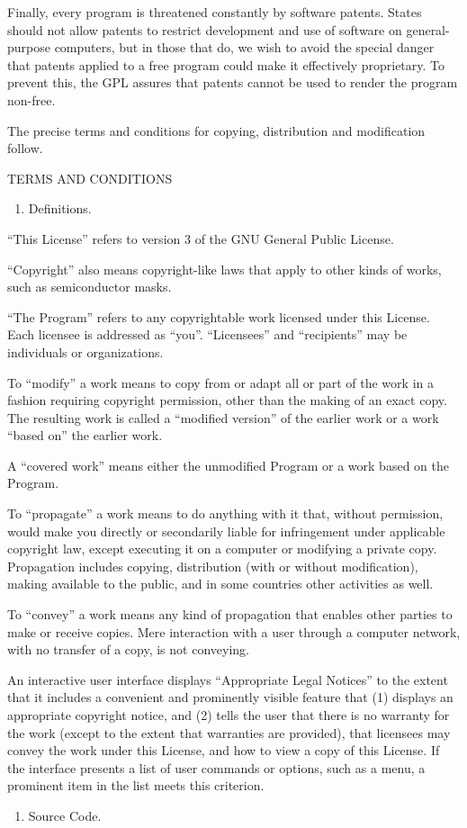 \documentclass[letterpaper,10pt,english]{sphinxmanual}
\begin{document}
Finally, every program is threatened constantly by software patents.
States should not allow patents to restrict development and use of
software on general-purpose computers, but in those that do, we wish to
avoid the special danger that patents applied to a free program could
make it effectively proprietary.  To prevent this, the GPL assures that
patents cannot be used to render the program non-free.

The precise terms and conditions for copying, distribution and
modification follow.

TERMS AND CONDITIONS
\begin{enumerate}
%
\setcounter{enumi}{-1}
\item {} 
Definitions.

\end{enumerate}

“This License” refers to version 3 of the GNU General Public License.

“Copyright” also means copyright-like laws that apply to other kinds of
works, such as semiconductor masks.

“The Program” refers to any copyrightable work licensed under this
License.  Each licensee is addressed as “you”.  “Licensees” and
“recipients” may be individuals or organizations.

To “modify” a work means to copy from or adapt all or part of the work
in a fashion requiring copyright permission, other than the making of an
exact copy.  The resulting work is called a “modified version” of the
earlier work or a work “based on” the earlier work.

A “covered work” means either the unmodified Program or a work based
on the Program.

To “propagate” a work means to do anything with it that, without
permission, would make you directly or secondarily liable for
infringement under applicable copyright law, except executing it on a
computer or modifying a private copy.  Propagation includes copying,
distribution (with or without modification), making available to the
public, and in some countries other activities as well.

To “convey” a work means any kind of propagation that enables other
parties to make or receive copies.  Mere interaction with a user through
a computer network, with no transfer of a copy, is not conveying.

An interactive user interface displays “Appropriate Legal Notices”
to the extent that it includes a convenient and prominently visible
feature that (1) displays an appropriate copyright notice, and (2)
tells the user that there is no warranty for the work (except to the
extent that warranties are provided), that licensees may convey the
work under this License, and how to view a copy of this License.  If
the interface presents a list of user commands or options, such as a
menu, a prominent item in the list meets this criterion.
\begin{enumerate}
%
\item {} 
Source Code.

\end{enumerate}
\end{document}
